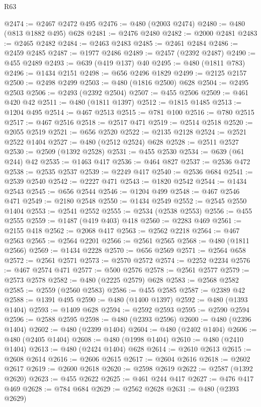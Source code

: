 \begin{lexlean}{R63}
\begin{coremodule}
@2474 := @2467 @2472 @495
@2476 := @480 (@2003 @2474)
@2480 := @480 (@813 @1882 @495) @628
@2481 := @2476 @2480
@2482 := @2000 @2481
@2483 := @2465 @2482
@2484 := @2463 @2483
@2485 := @2461 @2484
@2486 := @2459 @2485
@2487 := @1977 @2486
@2489 := @2457 (@2392 @2487)
@2490 := @455 @2489
@2493 := @639 (@419 @137) @40
@2495 := @480 (@1811 @783)
@2496 := @1434 @2151
@2498 := @656 @2496 @1829
@2499 := @2125 @2157
@2500 := @2498 @2499
@2503 := @480 (@1816 @2500) @628
@2504 := @2495 @2503
@2506 := @2493 (@2392 @2504)
@2507 := @455 @2506
@2509 := @461 @420 @42
@2511 := @480 (@1811 @1397)
@2512 := @1815 @1485
@2513 := @1204 @495
@2514 := @467 @2513
@2515 := @781 @100
@2516 := @780 @2515
@2517 := @467 @2516
@2518 := @2517 @471
@2519 := @2514 @2518
@2520 := @2055 @2519
@2521 := @656 @2520
@2522 := @2135 @2128
@2524 := @2521 @2522 @1404
@2527 := @480 (@2512 @2524) @628
@2528 := @2511 @2527
@2530 := @2509 (@1392 @2528)
@2531 := @455 @2530
@2534 := @639 (@61 @244) @42
@2535 := @1463 @417
@2536 := @464 @827
@2537 := @2536 @472
@2538 := @2535 @2537
@2539 := @2249 @417
@2540 := @2536 @684
@2541 := @2539 @2540
@2542 := @2227 @471
@2543 := @1820 @2542
@2544 := @1434 @2543
@2545 := @656 @2544
@2546 := @1204 @499
@2548 := @467 @2546 @471
@2549 := @2180 @2548
@2550 := @1434 @2549
@2552 := @2545 @2550 @1404
@2553 := @2541 @2552
@2555 := @2534 (@2538 @2553)
@2556 := @455 @2555
@2559 := @1487 (@419 @403) @418
@2560 := @2283 @469
@2561 := @2155 @418
@2562 := @2068 @417
@2563 := @2562 @2218
@2564 := @467 @2563
@2565 := @2564 @2201
@2566 := @2561 @2565
@2568 := @480 (@1811 @2566)
@2569 := @1434 @2228
@2570 := @656 @2569
@2571 := @2564 @658
@2572 := @2561 @2571
@2573 := @2570 @2572
@2574 := @2252 @2234
@2576 := @467 @2574 @471
@2577 := @500 @2576
@2578 := @2561 @2577
@2579 := @2573 @2578
@2582 := @480 (@2225 @2579) @628
@2583 := @2568 @2582
@2585 := @2559 (@2560 @2583)
@2586 := @455 @2585
@2587 := @2389 @42
@2588 := @1391 @495
@2590 := @480 (@1400 @1397)
@2592 := @480 (@1393 @1404)
@2593 := @1409 @628
@2594 := @2592 @2593
@2595 := @2590 @2594
@2596 := @2588 @2595
@2598 := @480 (@2393 @2596)
@2600 := @480 (@2396 @1404)
@2602 := @480 (@2399 @1404)
@2604 := @480 (@2402 @1404)
@2606 := @480 (@2405 @1404)
@2608 := @480 (@1998 @1404)
@2610 := @480 (@2410 @1404)
@2613 := @480 (@2424 @1404) @628
@2614 := @2610 @2613
@2615 := @2608 @2614
@2616 := @2606 @2615
@2617 := @2604 @2616
@2618 := @2602 @2617
@2619 := @2600 @2618
@2620 := @2598 @2619
@2622 := @2587 (@1392 @2620)
@2623 := @455 @2622
@2625 := @461 @244 @417
@2627 := @476 @417 @469
@2628 := @784 @684
@2629 := @2562 @2628
@2631 := @480 (@2393 @2629)

\end{coremodule}
\end{lexlean}
